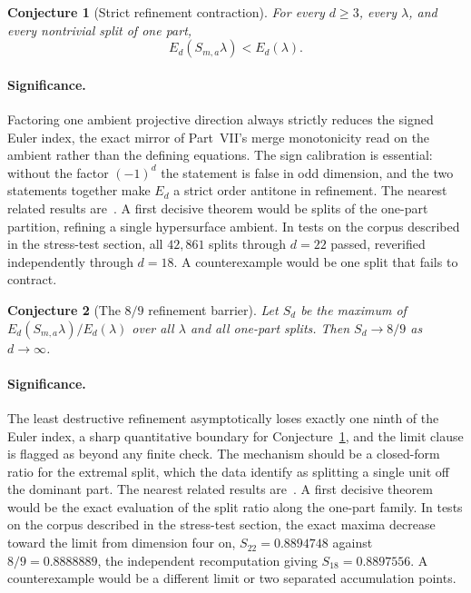 \documentclass[11pt]{article}
\newtheorem{conjecture}{Conjecture}
\theoremstyle{definition}
\begin{document}
\begin{conjecture}[Strict refinement contraction]\label{y2}
For every $d\ge3$, every $\lambda$, and every nontrivial split of one part,
\[
E_d(S_{m,a}\lambda)<E_d(\lambda).
\]
\end{conjecture}

\paragraph{Significance.}
Factoring one ambient projective direction always strictly reduces the signed Euler index, the exact mirror of Part~VII's merge monotonicity read on the ambient rather than the defining equations.  The sign calibration is essential: without the factor $(-1)^d$ the statement is false in odd dimension, and the two statements together make $E_d$ a strict order antitone in refinement.  The nearest related results are~\cite{He21,AndGCICY}.  A first decisive theorem would be splits of the one-part partition, refining a single hypersurface ambient.  In tests on the corpus described in the stress-test section, all $42{,}861$ splits through $d=22$ passed, reverified independently through $d=18$.  A counterexample would be one split that fails to contract.

\begin{conjecture}[The $8/9$ refinement barrier]\label{y3}
Let $S_d$ be the maximum of $E_d(S_{m,a}\lambda)/E_d(\lambda)$ over all $\lambda$ and all one-part splits.  Then $S_d\to8/9$ as $d\to\infty$.
\end{conjecture}

\paragraph{Significance.}
The least destructive refinement asymptotically loses exactly one ninth of the Euler index, a sharp quantitative boundary for Conjecture~\ref{y2}, and the limit clause is flagged as beyond any finite check.  The mechanism should be a closed-form ratio for the extremal split, which the data identify as splitting a single unit off the dominant part.  The nearest related results are~\cite{He21,AndGCICY}.  A first decisive theorem would be the exact evaluation of the split ratio along the one-part family.  In tests on the corpus described in the stress-test section, the exact maxima decrease toward the limit from dimension four on, $S_{22}=0.8894748$ against $8/9=0.8888889$, the independent recomputation giving $S_{18}=0.8897556$.  A counterexample would be a different limit or two separated accumulation points.
\end{document}
